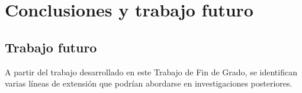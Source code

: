 
\chapter{Conclusiones y trabajo futuro}
\label{chap:conclusion}


\section{Trabajo futuro}
\label{sec:trabajo_futuro}

A partir del trabajo desarrollado en este Trabajo de Fin de Grado, se identifican varias líneas de extensión
que podrían abordarse en investigaciones posteriores.

